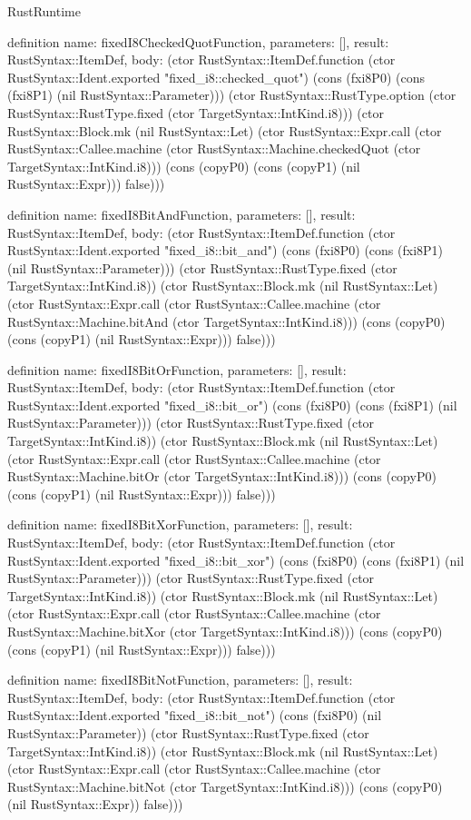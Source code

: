 \begin{lexlean}{RustRuntime}
\begin{semanticmodule}
definition{
  name: fixedI8CheckedQuotFunction,
  parameters: [],
  result: RustSyntax::ItemDef,
  body: (ctor RustSyntax::ItemDef.function (ctor RustSyntax::Ident.exported "fixed_i8::checked_quot") (cons (fxi8P0) (cons (fxi8P1) (nil RustSyntax::Parameter))) (ctor RustSyntax::RustType.option (ctor RustSyntax::RustType.fixed (ctor TargetSyntax::IntKind.i8))) (ctor RustSyntax::Block.mk (nil RustSyntax::Let) (ctor RustSyntax::Expr.call (ctor RustSyntax::Callee.machine (ctor RustSyntax::Machine.checkedQuot (ctor TargetSyntax::IntKind.i8))) (cons (copyP0) (cons (copyP1) (nil RustSyntax::Expr))) false)))
}

definition{
  name: fixedI8BitAndFunction,
  parameters: [],
  result: RustSyntax::ItemDef,
  body: (ctor RustSyntax::ItemDef.function (ctor RustSyntax::Ident.exported "fixed_i8::bit_and") (cons (fxi8P0) (cons (fxi8P1) (nil RustSyntax::Parameter))) (ctor RustSyntax::RustType.fixed (ctor TargetSyntax::IntKind.i8)) (ctor RustSyntax::Block.mk (nil RustSyntax::Let) (ctor RustSyntax::Expr.call (ctor RustSyntax::Callee.machine (ctor RustSyntax::Machine.bitAnd (ctor TargetSyntax::IntKind.i8))) (cons (copyP0) (cons (copyP1) (nil RustSyntax::Expr))) false)))
}

definition{
  name: fixedI8BitOrFunction,
  parameters: [],
  result: RustSyntax::ItemDef,
  body: (ctor RustSyntax::ItemDef.function (ctor RustSyntax::Ident.exported "fixed_i8::bit_or") (cons (fxi8P0) (cons (fxi8P1) (nil RustSyntax::Parameter))) (ctor RustSyntax::RustType.fixed (ctor TargetSyntax::IntKind.i8)) (ctor RustSyntax::Block.mk (nil RustSyntax::Let) (ctor RustSyntax::Expr.call (ctor RustSyntax::Callee.machine (ctor RustSyntax::Machine.bitOr (ctor TargetSyntax::IntKind.i8))) (cons (copyP0) (cons (copyP1) (nil RustSyntax::Expr))) false)))
}

definition{
  name: fixedI8BitXorFunction,
  parameters: [],
  result: RustSyntax::ItemDef,
  body: (ctor RustSyntax::ItemDef.function (ctor RustSyntax::Ident.exported "fixed_i8::bit_xor") (cons (fxi8P0) (cons (fxi8P1) (nil RustSyntax::Parameter))) (ctor RustSyntax::RustType.fixed (ctor TargetSyntax::IntKind.i8)) (ctor RustSyntax::Block.mk (nil RustSyntax::Let) (ctor RustSyntax::Expr.call (ctor RustSyntax::Callee.machine (ctor RustSyntax::Machine.bitXor (ctor TargetSyntax::IntKind.i8))) (cons (copyP0) (cons (copyP1) (nil RustSyntax::Expr))) false)))
}

definition{
  name: fixedI8BitNotFunction,
  parameters: [],
  result: RustSyntax::ItemDef,
  body: (ctor RustSyntax::ItemDef.function (ctor RustSyntax::Ident.exported "fixed_i8::bit_not") (cons (fxi8P0) (nil RustSyntax::Parameter)) (ctor RustSyntax::RustType.fixed (ctor TargetSyntax::IntKind.i8)) (ctor RustSyntax::Block.mk (nil RustSyntax::Let) (ctor RustSyntax::Expr.call (ctor RustSyntax::Callee.machine (ctor RustSyntax::Machine.bitNot (ctor TargetSyntax::IntKind.i8))) (cons (copyP0) (nil RustSyntax::Expr)) false)))
}


\end{semanticmodule}
\end{lexlean}
